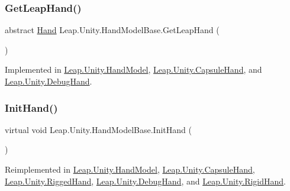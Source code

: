 \mbox{\label{class_leap_1_1_unity_1_1_hand_model_base_aa24ca02bf4a64ba33b0370ad6da8731f}} 
\subsubsection{\texorpdfstring{GetLeapHand()}{GetLeapHand()}}
{\footnotesize\ttfamily abstract \mbox{\hyperlink{class_leap_1_1_hand}{Hand}} Leap.\+Unity.\+Hand\+Model\+Base.\+Get\+Leap\+Hand (\begin{DoxyParamCaption}{ }\end{DoxyParamCaption})\hspace{0.3cm}{\ttfamily [pure virtual]}}



Implemented in \mbox{\hyperlink{class_leap_1_1_unity_1_1_hand_model_a8b8afb06879194f1c63089f0c0202b26}{Leap.\+Unity.\+Hand\+Model}}, \mbox{\hyperlink{class_leap_1_1_unity_1_1_capsule_hand_a6e1d6a507332ba5577a1e2b17332039b}{Leap.\+Unity.\+Capsule\+Hand}}, and \mbox{\hyperlink{class_leap_1_1_unity_1_1_debug_hand_a406218fbf7d947d156064ccc5ac84d06}{Leap.\+Unity.\+Debug\+Hand}}.

\mbox{\label{class_leap_1_1_unity_1_1_hand_model_base_a4789222f2b16957437c703f15afc1bbf}} 
\subsubsection{\texorpdfstring{InitHand()}{InitHand()}}
{\footnotesize\ttfamily virtual void Leap.\+Unity.\+Hand\+Model\+Base.\+Init\+Hand (\begin{DoxyParamCaption}{ }\end{DoxyParamCaption})\hspace{0.3cm}{\ttfamily [virtual]}}



Reimplemented in \mbox{\hyperlink{class_leap_1_1_unity_1_1_hand_model_a67f1a6887e0803c96095a376fc1e6031}{Leap.\+Unity.\+Hand\+Model}}, \mbox{\hyperlink{class_leap_1_1_unity_1_1_capsule_hand_a1dc96b8ca5deda73cac12d70b46bc9c5}{Leap.\+Unity.\+Capsule\+Hand}}, \mbox{\hyperlink{class_leap_1_1_unity_1_1_rigged_hand_a588b2f58a5ffbbfc451ddf8432228507}{Leap.\+Unity.\+Rigged\+Hand}}, \mbox{\hyperlink{class_leap_1_1_unity_1_1_debug_hand_a504064bb8442d990fbd080bda3c1c02c}{Leap.\+Unity.\+Debug\+Hand}}, and \mbox{\hyperlink{class_leap_1_1_unity_1_1_rigid_hand_a7e76c7f3a3128c1a2e0343a43e177efa}{Leap.\+Unity.\+Rigid\+Hand}}.




